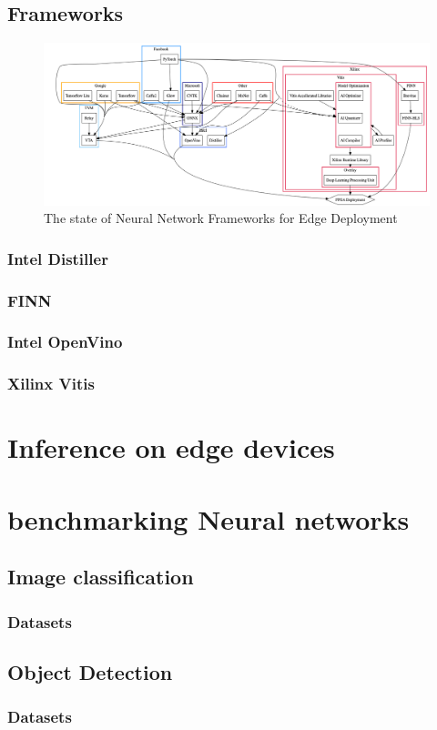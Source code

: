 \subsection{Frameworks}
\begin{figure}
\centering
\includegraphics[width=\textwidth]{Figures/diagram.png}
\caption[Neural Network Frameworks]{The state of Neural Network Frameworks for Edge Deployment}
\label{fig:Neural Network Frameworks}
\end{figure}


\subsubsection{Intel Distiller}
\subsubsection{FINN}
\subsubsection{Intel OpenVino}
\subsubsection{Xilinx Vitis}

\section{Inference on edge devices}

\section{benchmarking Neural networks}

\subsection{Image classification}
\subsubsection{Datasets}
\subsection{Object Detection}
\subsubsection{Datasets}